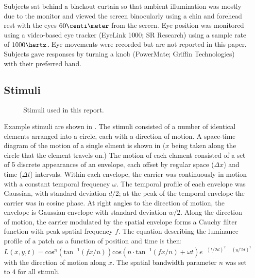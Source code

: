 \documentclass[english,jou]{article}
\begin{document}
Subjects sat behind a blackout curtain so that ambient illumination
was mostly due to the monitor and viewed the screen binocularly using
a chin and forehead rest with the eyes $60\centi\meter$
from the screen. Eye position was monitored using a video-based eye
tracker (EyeLink 1000; SR Research) using a sample rate of $1000\hertz$.
Eye movements were recorded but are not reported in this paper. Subjects
gave responses by turning a knob (PowerMate; Griffin Technologies)
with their preferred hand. 


\subsection{Stimuli\label{sub:stimuli}}

\begin{figure}


\caption{Stimuli used in this report.}


\end{figure}


Example stimuli are shown in . The stimuli consisted
of a number of identical elements arranged into a circle, each with
a direction of motion. A space-time diagram of the motion of a single
elment is shown in  ($x$ being taken along
the circle that the element travels on.) The motion of each elament
consisted of a set of 5
discrete appearances of an envelope, each offset by regular space
($\Delta x$) and time ($\Delta t$) intervals.  Within each envelope,
the carrier was continuously in motion with a constant temporal frequency
$\omega$. The temporal profile of each envelope was Gaussian, with
standard deviation $d/2$; at the peak of the temporal envelope the
carrier was in cosine phase. At right angles to the direction of motion,
the envelope is Gaussian envelope with standard deviation $w/2$.
Along the direction of motion, the carrier modulated by the spatial
envelope forms a Cauchy filter function \citep{Klein:1985rz} with
peak spatial frequency $f$. The equation describing the luminance
profile of a patch as a function of position and time is then: 
\[
L(x,y,t)=\mathrm{cos}^{n}(\mathrm{tan}^{-1}(fx/n))\mathrm{cos}(n\cdot\mathrm{tan}^{-1}(fx/n)+\omega t)e^{-(t/2d)^{2}-(y/2d)^{2}}
\]
 with the direction of motion along $x$. The spatial bandwidth parameter
$n$ was set to 4 for all stimuli. 
\end{document}

